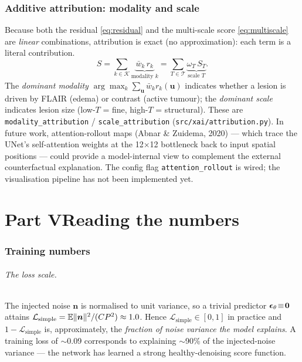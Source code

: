 \section{Additive attribution: modality and scale}
Because both the residual \eqref{eq:residual} and the multi-scale score
\eqref{eq:multiscale} are \emph{linear} combinations, attribution is exact (no
approximation): each term is a literal contribution.
\begin{equation}
S=\sum_{k\in\mathcal K}\underbrace{\bar w_k\, r_k}_{\text{modality } k}
=\sum_{T\in\mathcal T}\underbrace{\omega_T\,S_T}_{\text{scale } T}.
\end{equation}
The \emph{dominant modality} $\arg\max_k \sum_{\bm u}\bar w_k r_k(\bm u)$ indicates
whether a lesion is driven by FLAIR (edema) or contrast (active tumour); the
\emph{dominant scale} indicates lesion size (low-$T$ = fine, high-$T$ =
structural). These are \texttt{modality\_attribution} / \texttt{scale\_attribution}
(\texttt{src/xai/attribution.py}). In future work, attention-rollout maps (Abnar
\& Zuidema, 2020) --- which trace the UNet's self-attention weights at the
12$\times$12 bottleneck back to input spatial positions --- could provide a
model-internal view to complement the external counterfactual explanation. The
config flag \texttt{attention\_rollout} is wired; the visualisation pipeline has
not been implemented yet.

\part*{Part V\quad Reading the numbers}
\label{part:numbers}

\section{Training numbers}
\paragraph{The loss scale.} The injected noise $\bm n$ is normalised to unit
variance, so a trivial predictor $\bm{\epsilon}_\theta\!\equiv\!\bm0$ attains
$\mathcal L_{\text{simple}}=\mathbb{E}\|\bm n\|^2/(CP^2)\approx 1.0$. Hence
$\mathcal L_{\text{simple}}\in[0,1]$ in practice and
$1-\mathcal L_{\text{simple}}$ is, approximately, the \emph{fraction of noise
variance the model explains}. A training loss of $\sim$0.09 corresponds to
explaining $\sim$90\% of the injected-noise variance --- the network has learned
a strong healthy-denoising score function.
